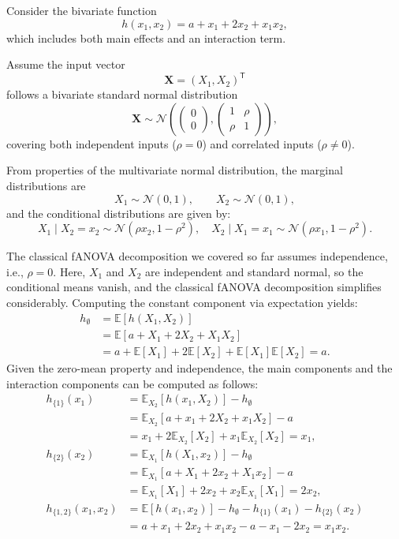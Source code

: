 \begin{example}\label{ex:running_example}
Consider the bivariate function
\begin{equation}\label{eq:running_example_function}
    h(x_1, x_2) = a + x_1 + 2x_2 + x_1 x_2,
\end{equation}
which includes both main effects and an interaction term.

Assume the input vector
\[
\boldsymbol{X} = (X_1, X_2)^\mathsf{T}
\]
follows a bivariate standard normal distribution
\[
\boldsymbol{X} \sim \mathcal{N}\!\left(
\begin{pmatrix}0 \\ 0\end{pmatrix},
\begin{pmatrix}
1 & \rho \\ 
\rho & 1
\end{pmatrix}
\right),
\]
covering both independent inputs ($\rho = 0$) and correlated inputs ($\rho \neq 0$).

From properties of the multivariate normal distribution, the marginal distributions are
\[
X_1 \sim \mathcal{N}(0,1), \qquad X_2 \sim \mathcal{N}(0,1),
\]
and the conditional distributions are given by:
\[
X_1 \mid X_2=x_2 \sim \mathcal{N}(\rho x_2, 1-\rho^2), \quad
X_2 \mid X_1=x_1 \sim \mathcal{N}(\rho x_1, 1-\rho^2).
\]
\end{example}
The classical fANOVA decomposition we covered so far assumes independence, i.e., $\rho = 0$. 
Here, $X_1$ and $X_2$ are independent and standard normal, so the conditional means vanish, and the classical fANOVA decomposition simplifies considerably. 
Computing the constant component via expectation yields:
\begin{align*}
    h_{\emptyset} &= \mathbb{E}[h(X_1, X_2)] \\
    &= \mathbb{E}[a + X_1 + 2X_2 + X_1X_2] \\
    &= a + \mathbb{E}[X_1] + 2\mathbb{E}[X_2] + \mathbb{E}[X_1]\mathbb{E}[X_2] = a.
\end{align*}
Given the zero-mean property and independence, the main components and the interaction components can be computed as follows:
\begin{align*}
h_{\{1\}}(x_1) &= \mathbb{E}_{X_2}[h(x_1, X_2)] - h_{\emptyset} \\
&= \mathbb{E}_{X_2}[a + x_1 + 2X_2 + x_1X_2] - a \\
&= x_1 + 2\mathbb{E}_{X_2}[X_2] + x_1\mathbb{E}_{X_2}[X_2] = x_1,\\
h_{\{2\}}(x_2) &= \mathbb{E}_{X_1}[h(X_1, x_2)] - h_{\emptyset} \\
&= \mathbb{E}_{X_1}[a + X_1 + 2x_2 + X_1x_2] - a \\
&= \mathbb{E}_{X_1}[X_1] + 2x_2 + x_2\mathbb{E}_{X_1}[X_1] = 2x_2,\\
h_{\{1,2\}}(x_1, x_2) &= \mathbb{E}[h(x_1, x_2)] - h_{\emptyset} - h_{\{1\}}(x_1) - h_{\{2\}}(x_2) \\
&= a + x_1 + 2x_2 + x_1x_2 - a - x_1 - 2x_2 = x_1x_2.
\end{align*}
